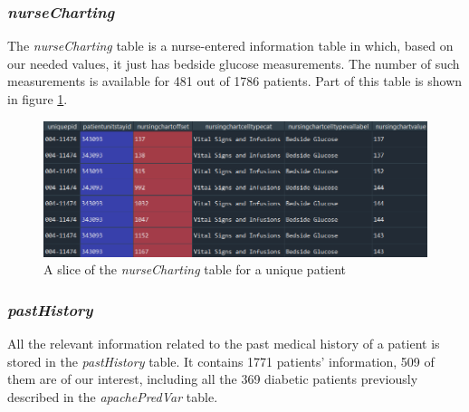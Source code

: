 \subsubsection{\textit{nurseCharting}}
The \textit{nurseCharting} table is a nurse-entered information table in which, based on our needed values, it just has bedside glucose measurements. The number of such measurements is available for 481 out of 1786 patients. Part of this table is shown in figure \ref{fig:nursechart}.

\begin{figure}[ht]
\centering
\includegraphics[width=15cm]{fig/chapter3/nursechart_m.png}
\caption{A slice of the \textit{nurseCharting} table for a unique patient}
\label{fig:nursechart}
\end{figure}

\subsubsection{\textit{pastHistory}}
All the relevant information related to the past medical history of a patient is stored in the \textit{pastHistory} table. It contains 1771 patients' information, 509 of them are of our interest, including all the 369 diabetic patients previously described in the \textit{apachePredVar} table.

